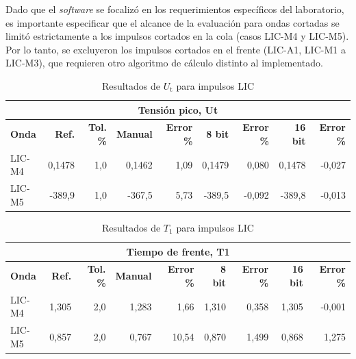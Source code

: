 Dado que el \emph{software} se focalizó en los requerimientos específicos del laboratorio, es importante especificar que el alcance de la evaluación para ondas cortadas se limitó estrictamente a los impulsos cortados en la cola (casos LIC-M4 y LIC-M5). Por lo tanto, se excluyeron los impulsos cortados en el frente (LIC-A1, LIC-M1 a LIC-M3), que requieren otro algoritmo de cálculo distinto al implementado.

\vspace{3\baselineskip}
\begin{table}[H]
    \centering
    \begin{tabular}{@{}lrrrrrrrr@{}}
        \toprule
        \multicolumn{9}{c}{\textbf{Tensión pico, Ut}}                                                                                                                     \\ \midrule
        \textbf{Onda} & \textbf{Ref.} & \textbf{Tol. \%} & \textbf{Manual} & \textbf{Error \%} & \textbf{8 bit} & \textbf{Error \%} & \textbf{16 bit} & \textbf{Error \%} \\ \midrule
        LIC-M4        & 0,1478        & 1,0              & 0,1462          & 1,09              & 0,1479         & 0,080             & 0,1478          & -0,027            \\ \midrule
        LIC-M5        & -389,9        & 1,0              & -367,5          & 5,73              & -389,5         & -0,092            & -389,8          & -0,013            \\ \bottomrule
    \end{tabular}
    \caption{Resultados de $U_\text{t}$ para impulsos LIC}
    \label{tab:resultados_ut_lic}
\end{table}
\vspace{3\baselineskip}

\vspace{3\baselineskip}
\begin{table}[H]
    \centering
    \begin{tabular}{@{}lrrrrrrrr@{}}
        \toprule
        \multicolumn{9}{c}{\textbf{Tiempo de frente, T1}}                                                                                                                 \\ \midrule
        \textbf{Onda} & \textbf{Ref.} & \textbf{Tol. \%} & \textbf{Manual} & \textbf{Error \%} & \textbf{8 bit} & \textbf{Error \%} & \textbf{16 bit} & \textbf{Error \%} \\ \midrule
        LIC-M4        & 1,305         & 2,0              & 1,283           & 1,66              & 1,310          & 0,358             & 1,305           & -0,001            \\ \midrule
        LIC-M5        & 0,857         & 2,0              & 0,767           & 10,54             & 0,870          & 1,499             & 0,868           & 1,275             \\ \bottomrule
    \end{tabular}
    \caption{Resultados de $T_1$ para impulsos LIC}
    \label{tab:resultados_t1_lic}
\end{table}
\vspace{3\baselineskip}


